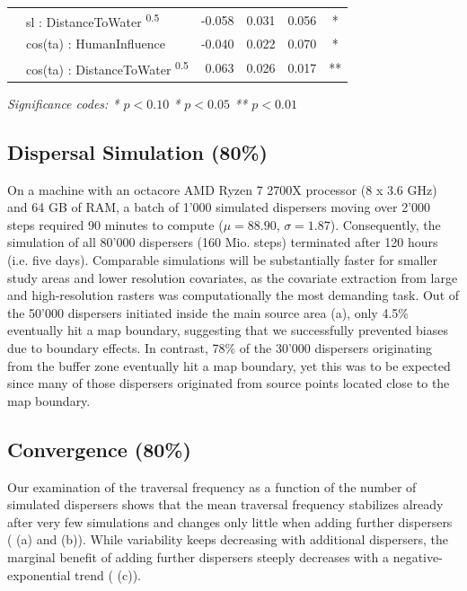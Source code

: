 \documentclass[abstract=on,10pt,a4paper,bibliography=totocnumbered]{article}
\begin{document}
\begin{table}
\begin{center}
{\begin{threeparttable}
\begin{tabular}{llrrrc}
         & sl : DistanceToWater \textsuperscript{0.5} & -0.058 & 0.031 & 0.056 & * \\
         & cos(ta) : HumanInfluence & -0.040 & 0.022 & 0.070 & * \\
         & cos(ta) : DistanceToWater \textsuperscript{0.5} & 0.063 & 0.026 & 0.017 & ** \\
         \bottomrule
      \end{tabular}
       \begin{tablenotes}
         \item \textit{Significance codes: * \(p < 0.10\) \quad ** \(p < 0.05\)
         \quad *** \(p < 0.01\)}
       \end{tablenotes}
    \end{threeparttable}
    }
  \end{center}
\end{table}

\subsection{Dispersal Simulation (80\%)}
On a machine with an octacore AMD Ryzen 7 2700X processor (8 x 3.6 GHz) and 64
GB of RAM, a batch of 1'000 simulated dispersers moving over 2'000 steps
required 90 minutes to compute (\(\mu = 88.90\), \(\sigma = 1.87\)).
Consequently, the simulation of all 80'000 dispersers (160 Mio. steps)
terminated after 120 hours (i.e. five days). Comparable simulations will be
substantially faster for smaller study areas and lower resolution covariates, as
the covariate extraction from large and high-resolution rasters was
computationally the most demanding task. Out of the 50'000 dispersers initiated
inside the main source area (a), only 4.5\% eventually hit a
map boundary, suggesting that we successfully prevented biases due to boundary
effects. In contrast, 78\% of the 30'000 dispersers originating from the buffer
zone eventually hit a map boundary, yet this was to be expected since many of
those dispersers originated from source points located close to the map
boundary.

\subsection{Convergence (80\%)}
Our examination of the traversal frequency as a function of the number of
simulated dispersers shows that the mean traversal frequency stabilizes already
after very few simulations and changes only little when adding further
dispersers ( (a) and (b)). While variability keeps decreasing
with additional dispersers, the marginal benefit of adding further dispersers
steeply decreases with a negative-exponential trend ( (c)).
\end{document}
